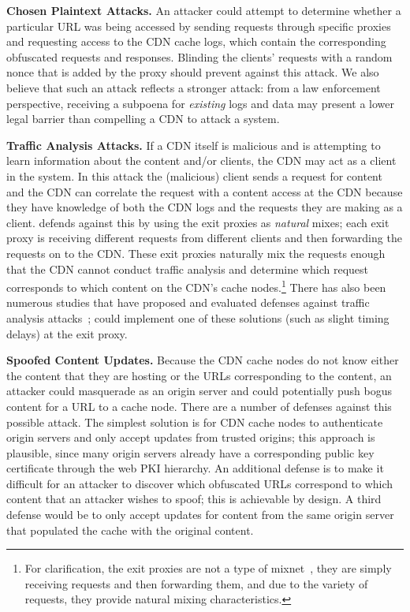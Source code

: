 \textbf{Chosen Plaintext Attacks.} An attacker could attempt to
determine whether a particular URL was being accessed by sending requests
through specific \system{} proxies and requesting access to the CDN cache logs, 
which contain the corresponding obfuscated
requests and responses. Blinding the clients' requests
with a random nonce that is added by the proxy should prevent against this
attack. We also believe that such an attack reflects a stronger attack: from a
law enforcement perspective, receiving a subpoena for {\em existing} logs and
data may present a lower legal barrier than compelling a CDN to attack a
system.

\textbf{Traffic Analysis Attacks.} If a CDN itself is malicious and is attempting 
to learn information about the content and/or clients, the CDN may act as a client 
in the system.  In this attack the (malicious) client sends a request for content 
and the CDN can correlate the request with a content access at the CDN because they have 
knowledge of both the CDN logs and the requests they are making as a client.  \system{} 
defends against this by using the exit proxies as {\it natural} mixes; each exit proxy is receiving 
different requests from different clients and then forwarding the requests on to the CDN.  
These exit proxies naturally mix the requests enough that the CDN cannot conduct traffic analysis
 and determine which request corresponds to which content on the CDN's cache nodes.\footnote{For clarification, the exit proxies 
are not a type of mixnet~\cite{chaum1981untraceable}, they are simply receiving requests and then forwarding them, and due to the variety of 
requests, they provide natural mixing characteristics.}  There has 
also been numerous studies that have proposed and evaluated defenses against traffic 
analysis attacks~\cite{wright2009traffic,rackoff1993cryptographic}; \system{} could implement one of these solutions (such as slight timing delays) at the exit 
proxy.

\textbf{Spoofed Content Updates.} Because the CDN cache
nodes do not know either the content that they are hosting or the URLs
corresponding to the content, an attacker could masquerade as an origin server
and could potentially push bogus content for a URL to a cache node. There are
a number of defenses against this possible attack. The simplest solution is
for CDN cache nodes to authenticate origin servers and only accept updates
from trusted origins; this approach is plausible, since many origin servers already
have a corresponding public key certificate through the web PKI hierarchy.  An additional
defense is to make it difficult for an attacker to discover which obfuscated URLs correspond
to which content that an attacker wishes to spoof; this is achievable by design.
A third defense would be to only accept updates for content from the same origin
server that populated the cache with the original content.

